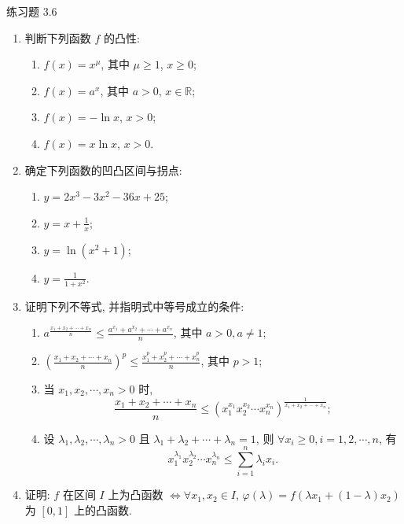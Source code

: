 \begin{exblock}{练习题 3.6}
\begin{enumerate}
  \item 判断下列函数 $f$ 的凸性:
  \begin{enumerate}[label=(\arabic*)]
    \item $f(x)=x^{\mu}$, 其中 $\mu\geqslant 1$, $x\geqslant 0$;
    \item $f(x)=a^{x}$, 其中 $a>0$, $x\in\mathbb{R}$;
    \item $f(x)=-\ln x$, $x>0$;
    \item $f(x)=x\ln x$, $x>0$.
  \end{enumerate}

  \item 确定下列函数的凹凸区间与拐点:
  \begin{enumerate}[label=(\arabic*)]
    \item $y=2x^{3}-3x^{2}-36x+25$;
    \item $y=x+\frac{1}{x}$;
    \item $y=\ln(x^{2}+1)$;
    \item $y=\frac{1}{1+x^{2}}$.
  \end{enumerate}

  \item 证明下列不等式, 并指明式中等号成立的条件:
  \begin{enumerate}[label=(\arabic*)]
    \item $a^{\frac{x_{1}+x_{2}+\cdots+x_{n}}{n}}\leqslant\frac{a^{x_{1}}+a^{x_{2}}+\cdots+a^{x_{n}}}{n}$, 其中 $a>0, a\neq 1$;
    \item $\left(\frac{x_{1}+x_{2}+\cdots+x_{n}}{n}\right)^{p}\leqslant\frac{x_{1}^{p}+x_{2}^{p}+\cdots+x_{n}^{p}}{n}$, 其中 $p>1$;
    \item 当 $x_{1},x_{2},\cdots,x_{n}>0$ 时,
    \[
    \frac{x_{1}+x_{2}+\cdots+x_{n}}{n}\leqslant(x_{1}^{x_{1}}x_{2}^{x_{2}}\cdots x_{n}^{x_{n}})^{\frac{1}{x_{1}+x_{2}+\cdots+x_{n}}};
\]
    \item 设 $\lambda_{1},\lambda_{2},\cdots,\lambda_{n}>0$ 且 $\lambda_{1}+\lambda_{2}+\cdots+\lambda_{n}=1$, 则 $\forall x_{i}\geqslant 0, i=1,2,\cdots,n$, 有
    \[
    x_{1}^{\lambda_{1}}x_{2}^{\lambda_{2}}\cdots x_{n}^{\lambda_{n}}\leqslant\sum_{i=1}^{n}\lambda_{i}x_{i}.
\]
  \end{enumerate}

  \item 证明: $f$ 在区间 $I$ 上为凸函数 $\Longleftrightarrow \forall x_{1},x_{2}\in I$, $\varphi(\lambda)=f(\lambda x_{1}+(1-\lambda)x_{2})$ 为 $[0,1]$ 上的凸函数.


\end{enumerate}
\end{exblock}
